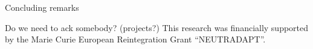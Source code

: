 Concluding remarks

\begin{acknowledgements}
Do we need to ack somebody? (projects?)
This research was financially supported by the Marie Curie European
Reintegration Grant ``NEUTRADAPT''.
\end{acknowledgements}


%
%



